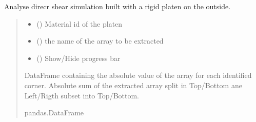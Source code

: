 \documentclass[letterpaper,10pt,english]{sphinxmanual}
\begin{document}
\begin{fulllineitems}
\begin{fulllineitems}
\label{\detokenize{openfdem:openfdem.openfdem.Model.direct_shear_calculation}}
\pysigstartsignatures
{}
\pysigstopsignatures
\sphinxAtStartPar
Analyse direcr shear simulation built with a rigid platen on the outside.
\begin{quote}\begin{description}
\begin{itemize}
\item {} 
\sphinxAtStartPar
{} () \textendash{} Material id of the platen

\item {} 
\sphinxAtStartPar
{} () \textendash{} the name of the array to be extracted

\item {} 
\sphinxAtStartPar
{} () \textendash{} Show/Hide progress bar

\end{itemize}

\sphinxAtStartPar
DataFrame containing the absolute value of the array for each identified corner. Absolute sum of the extracted array split in Top/Bottom ane Left/Rigth sub\sphinxhyphen{}set into Top/Bottom.

\sphinxAtStartPar
pandas.DataFrame

\end{description}\end{quote}


\end{fulllineitems}
\end{fulllineitems}
\end{document}
